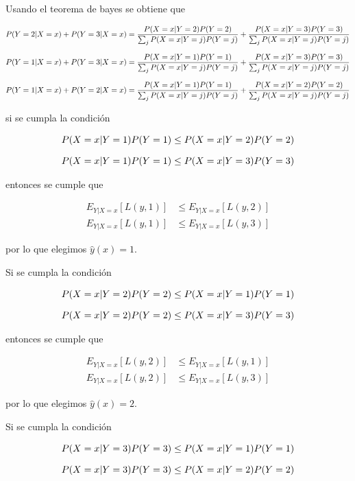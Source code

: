 Usando el teorema de bayes se obtiene que

\footnotesize
\begin{align*}
    P(Y=2|X=x) + P(Y=3|X=x) & =  \frac{P(X=x|Y=2)P(Y=2)}{\sum_j P(X=x|Y=j)P(Y=j)}+ \frac{P(X=x|Y=3)P(Y=3)}{\sum_j P(X=x|Y=j)P(Y=j)} \\[0.25cm]
    P(Y=1|X=x) + P(Y=3|X=x) & =  \frac{P(X=x|Y=1)P(Y=1)}{\sum_j P(X=x|Y=j)P(Y=j)}+ \frac{P(X=x|Y=3)P(Y=3)}{\sum_j P(X=x|Y=j)P(Y=j)} \\[0.25cm]
    P(Y=1|X=x) + P(Y=2|X=x) & =  \frac{P(X=x|Y=1)P(Y=1)}{\sum_j P(X=x|Y=j)P(Y=j)}+ \frac{P(X=x|Y=2)P(Y=2)}{\sum_j P(X=x|Y=j)P(Y=j)} \\
\end{align*}
\normalsize

si se cumpla la condición

\begin{align*}
    P(X=x|Y=1)P(Y=1) & \leq P(X=x|Y=2)P(Y=2) \\[0.25cm]
    P(X=x|Y=1)P(Y=1) & \leq P(X=x|Y=3)P(Y=3)
\end{align*}

entonces se cumple que

\begin{align*}
    E_{Y|X=x} [L(y,1)] & \leq E_{Y|X=x} [L(y,2)] \\
    E_{Y|X=x} [L(y,1)] & \leq E_{Y|X=x} [L(y,3)]
\end{align*}

por lo que elegimos $\hat{y}(x)=1$.

Si se cumpla la condición

\begin{align*}
    P(X=x|Y=2)P(Y=2) & \leq P(X=x|Y=1)P(Y=1) \\[0.25cm]
    P(X=x|Y=2)P(Y=2) & \leq P(X=x|Y=3)P(Y=3)
\end{align*}

entonces se cumple que

\begin{align*}
    E_{Y|X=x} [L(y,2)] & \leq E_{Y|X=x} [L(y,1)] \\
    E_{Y|X=x} [L(y,2)] & \leq E_{Y|X=x} [L(y,3)]
\end{align*}

por lo que elegimos $\hat{y}(x)=2$.

Si se cumpla la condición

\begin{align*}
    P(X=x|Y=3)P(Y=3) & \leq P(X=x|Y=1)P(Y=1) \\[0.25cm]
    P(X=x|Y=3)P(Y=3) & \leq P(X=x|Y=2)P(Y=2)
\end{align*}

